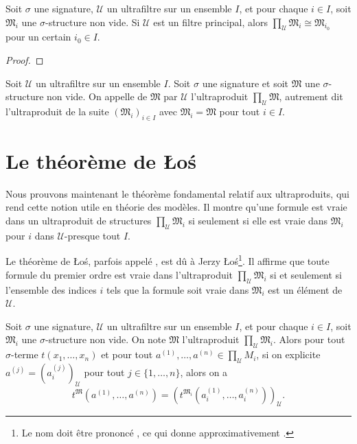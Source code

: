 \begin{proposition}
	Soit $\sigma$ une signature, $\mathcal{U}$ un ultrafiltre sur un ensemble $I$, et pour chaque $i\in I$, soit $\mathfrak{M}_{i}$ une $\sigma$-structure non vide. Si $\mathcal{U}$ est un filtre principal, alors $\prod_{\mathcal{U}}\mathfrak{M}_{i}\cong\mathfrak{M}_{i_{0}}$ pour un certain $i_{0}\in I$.
\end{proposition}

\begin{proof}
\end{proof}

\begin{definition}
	Soit $\mathcal{U}$ un ultrafiltre sur un ensemble $I$. Soit $\sigma$ une signature et soit $\mathfrak{M}$ une $\sigma$-structure non vide. On appelle  de $\mathfrak{M}$ par $\mathcal{U}$ l'ultraproduit $\prod_{\mathcal{U}}\mathfrak{M}$, autrement dit l'ultraproduit de la suite $\left(\mathfrak{M}_{i}\right)_{i\in I}$ avec $\mathfrak{M}_{i}=\mathfrak{M}$ pour tout $i\in I$.
\end{definition}



\section{Le théorème de Łoś}

Nous prouvons maintenant le théorème fondamental relatif aux ultraproduits, qui rend cette notion utile en théorie des modèles. Il montre qu'une formule est vraie dans un ultraproduit de structures $\prod_{\mathcal{U}}\mathfrak{M}_{i}$ si seulement si elle est vraie dans $\mathfrak{M}_{i}$ pour $i$ dans $\mathcal{U}$-presque tout $I$.

Le théorème de Łoś, parfois appelé , est dû à Jerzy Łoś\footnote{Le nom  doit être prononcé , ce qui donne approximativement .}. Il affirme que toute formule du premier ordre est vraie dans l'ultraproduit $\prod_{\mathcal{U}}\mathfrak{M}_{i}$ si et seulement si l'ensemble des indices $i$ tels que la formule soit vraie dans $\mathfrak{M}_{i}$ est un élément de $\mathcal{U}$.

\begin{lemma}\label{lem.Los-terme}
	Soit $\sigma$ une signature, $\mathcal{U}$ un ultrafiltre sur un ensemble $I$, et pour chaque $i\in I$, soit $\mathfrak{M}_{i}$ une $\sigma$-structure non vide. On note $\mathfrak{M}$ l'ultraproduit $\prod_{\mathcal{U}}\mathfrak{M}_{i}$. Alors pour tout $\sigma$-terme $t\left(x_{1},\dots,x_{n}\right)$ et pour tout $a^{\left(1\right)},\dots,a^{\left(n\right)}\in\prod_{\mathcal{U}}M_{i}$, si on explicite $a^{\left(j\right)}=\left(a_{i}^{\left(j\right)}\right)_{\mathcal{U}}$ pour tout $j\in\{1,\dots,n\}$, alors on a
	\[
		t^{\mathfrak{M}}\left(a^{\left(1\right)},\dots,a^{\left(n\right)}\right)=\left(t^{\mathfrak{M}_{i}}\left(a_{i}^{\left(1\right)},\dots,a_{i}^{\left(n\right)}\right)\right)_{\mathcal{U}}.
	\]
\end{lemma}

